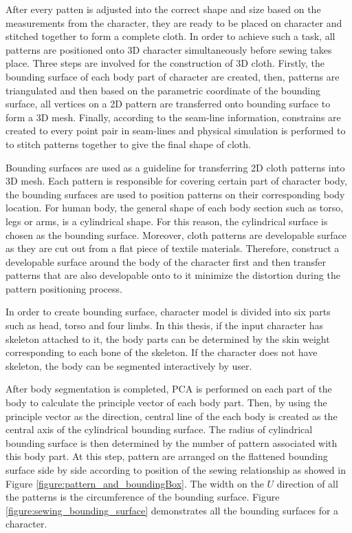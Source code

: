 After every patten is adjusted into the correct shape and size based on the measurements from the character, they are ready to be placed on character and stitched together to form a complete cloth. In order to achieve such a task, all patterns are positioned onto 3D character simultaneously before sewing takes place. Three steps are involved for the construction of 3D cloth. Firstly, the bounding surface of each body part of character are created, then, patterns are triangulated and then based on the parametric coordinate of the bounding surface, all vertices on a 2D pattern are transferred onto bounding surface to form a 3D mesh. Finally, according to the seam-line information, constrains are created to every point pair in seam-lines and physical simulation is performed to to stitch patterns together to give the final shape of cloth.

Bounding surfaces are used as a guideline for transferring 2D cloth patterns into 3D mesh. Each pattern is responsible for covering certain part of character body, the bounding surfaces are used to position patterns on their corresponding body location. For human body, the general shape of each body section such as torso, legs or arms, is a cylindrical shape. For this reason, the cylindrical surface is chosen as the bounding surface. Moreover, cloth patterns are developable surface as they are cut out from a flat piece of textile materials. Therefore, construct a developable surface around the body of the character first and then transfer patterns that are also developable onto to it minimize the distortion during the pattern positioning process. 

In order to create bounding surface, character model is divided into six parts such as head, torso and four limbs. In this thesis, if the input character has skeleton attached to it, the body parts can be determined by the skin weight corresponding to each bone of the skeleton. If the character does not have skeleton, the body can be segmented interactively by user.

After body segmentation is completed, PCA is performed on each part of the body to calculate the principle vector of each body part. Then, by using the principle vector as the direction, central line of the each body is created as the central axis of the cylindrical bounding surface. The radius of  cylindrical bounding surface is then determined by the number of pattern associated with this body part. At this step, pattern are arranged on the flattened bounding surface side by side according to position of the sewing relationship as showed in Figure \ref{figure:pattern_and_boundingBox}. The width on the $U$ direction of all the patterns is the circumference of the bounding surface. Figure \ref{figure:sewing_bounding_surface} demonstrates all the bounding surfaces for a character.

